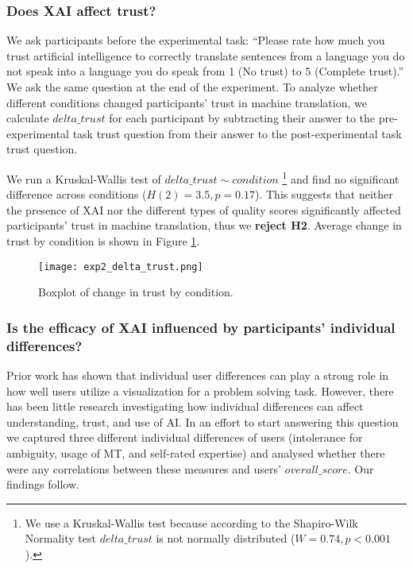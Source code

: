 \subsubsection{Does XAI affect trust?}

We ask participants before the experimental task: “Please rate how much you trust artificial intelligence to correctly translate sentences from a language you do not speak into a language you do speak from 1 (No trust) to 5 (Complete trust).”  We ask the same question at the end of the experiment. To analyze whether different conditions changed participants' trust in machine translation, we calculate $delta\_trust$ for each participant by subtracting their answer to the pre-experimental task trust question from their answer to the post-experimental task trust question. 

We run a Kruskal-Wallis test of $delta\_trust \sim condition$ \footnote{We use a Kruskal-Wallis test because according to the Shapiro-Wilk Normality test $delta\_trust$ is not normally distributed ($W = 0.74, p < 0.001$).} and find no significant difference across conditions ($H(2) = 3.5, p = 0.17$). This suggests that neither the presence of XAI nor the different types of quality scores significantly affected participants’ trust in machine translation, thus we \textbf{reject H2}. Average change in trust by condition is shown in Figure \ref{fig:exp_delta_trust}.

\begin{figure}[h!]
    \centering
    \texttt{[image: exp2\_delta\_trust.png]}
    \caption{Boxplot of change in trust by condition.}
    \label{fig:exp_delta_trust}
\end{figure}

\subsubsection{Is the efficacy of XAI influenced by participants' individual differences?}

Prior work has shown that individual user differences can play a strong role in how well users utilize a visualization for a problem solving task\cite{liuSurvey2020}. However, there has been little research investigating how individual differences can affect understanding, trust, and use of AI. In an effort to start answering this question we captured three different individual differences of users (intolerance for ambiguity, usage of MT, and self-rated expertise) and analysed whether there were any correlations between these measures and users’ $overall\_score$. Our findings follow.

